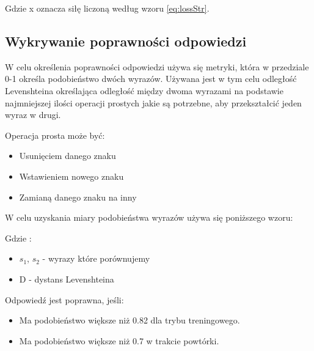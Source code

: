 
Gdzie x oznacza siłę liczoną według wzoru \ref{eq:lossStr}.

\subsection{Wykrywanie poprawności odpowiedzi}
\label{sec:similarity}
W celu określenia poprawności odpowiedzi używa się metryki, która w przedziale 0-1 określa podobieństwo dwóch wyrazów. Używana jest w tym celu odległość Levenshteina określająca odległość między dwoma wyrazami na podstawie najmniejszej ilości operacji prostych jakie są potrzebne, aby przekształcić jeden wyraz w drugi. \cite{Leve}

Operacja prosta może być:
\begin{itemize}
	\item Usunięciem danego znaku
	\item Wstawieniem nowego znaku
	\item Zamianą danego znaku na inny
\end{itemize}

W celu uzyskania miary podobieństwa wyrazów używa się poniższego wzoru: 


Gdzie :
\begin{itemize} 
	\item $s_1$, $s_2$ - wyrazy które porównujemy
	\item D - dystans Levenshteina
\end{itemize}

\vspace{1cm}

Odpowiedź jest poprawna, jeśli:
\begin{itemize}
	\item Ma podobieństwo większe niż 0.82 dla trybu treningowego.
	\item Ma podobieństwo większe niż 0.7 w trakcie powtórki.
\end{itemize}

